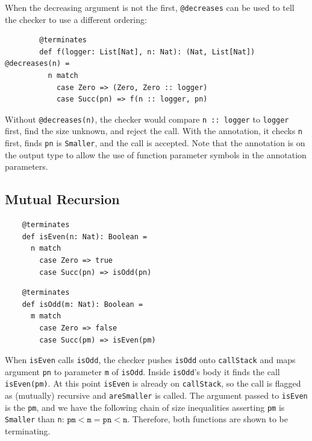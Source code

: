 When the decreasing argument is not the first, \texttt{@decreases} can be used
to tell the checker to use a different ordering:
\begin{verbatim}
        @terminates
        def f(logger: List[Nat], n: Nat): (Nat, List[Nat]) @decreases(n) =
          n match
            case Zero => (Zero, Zero :: logger)
            case Succ(pn) => f(n :: logger, pn)
\end{verbatim}
Without \texttt{@decreases(n)}, the checker would compare \texttt{n :: logger}
to \texttt{logger} first, find the size unknown, and reject the call. With the
annotation, it checks \texttt{n} first, finds \texttt{pn} is \texttt{Smaller},
and the call is accepted.
Note that the annotation is on the output type to allow the use of function
parameter symbols in the annotation parameters.

\subsection{Mutual Recursion} \label{sec:mutualRec}
\begin{minipage}[t]{0.45\textwidth}
    \begin{verbatim}
    @terminates
    def isEven(n: Nat): Boolean =
      n match
        case Zero => true
        case Succ(pn) => isOdd(pn)
    \end{verbatim}
\end{minipage}\hfill
\begin{minipage}[t]{0.45\textwidth}
    \begin{verbatim}
    @terminates
    def isOdd(m: Nat): Boolean =
      m match
        case Zero => false
        case Succ(pm) => isEven(pm)
    \end{verbatim}
\end{minipage}

When \texttt{isEven} calls \texttt{isOdd}, the checker pushes \texttt{isOdd}
onto \texttt{callStack} and maps argument \texttt{pn} to parameter \texttt{m} of
\texttt{isOdd}. Inside \texttt{isOdd}'s body it finds the call
\texttt{isEven(pm)}. At this point \texttt{isEven} is already on
\texttt{callStack}, so the call is flagged as (mutually) recursive and
\texttt{areSmaller} is called. The argument passed to \texttt{isEven} is the
\texttt{pm}, and we have the following chain of size inequalities asserting
\texttt{pm} is \texttt{Smaller} than \texttt{n}: $\texttt{pm} < \texttt{m} =
\texttt{pn} < \texttt{n}$. Therefore, both functions are shown to be
terminating.

